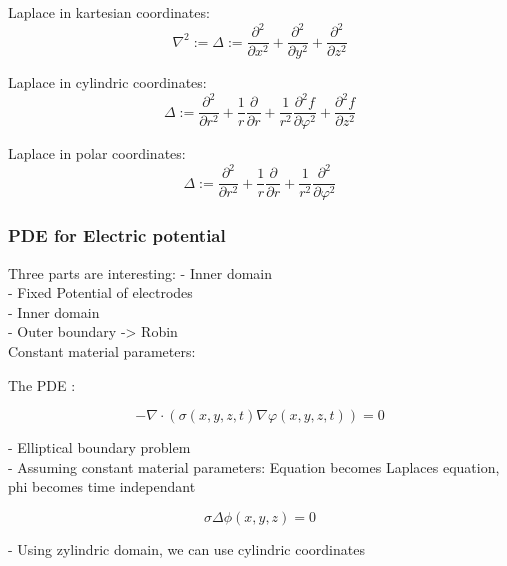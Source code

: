 \documentclass[parskip=half, titlepage=yes, 12pt, BCOR=12mm, DIV=calc]{scrartcl}
\begin{document}
Laplace in kartesian coordinates:
\begin{equation}
    \nabla^2 := \Delta := \frac{\partial^2}{\partial x^2} + \frac{\partial^2}{\partial y^2} + \frac{\partial^2}{\partial z^2}
\end{equation}

Laplace in cylindric coordinates:
\begin{equation}
    \Delta := \frac{\partial^2}{\partial r^2} + \frac{1}{r} \frac{\partial}{\partial r} + \frac{1}{r^2} \frac{\partial^2 f}{\partial \varphi^2} + \frac{\partial^2 f}{\partial z^2}
\end{equation}

Laplace in polar coordinates:
\begin{equation}
    \Delta := \frac{\partial^2}{\partial r^2} + \frac{1}{r} \frac{\partial}{\partial r} + \frac{1}{r^2} \frac{\partial^2}{\partial \varphi^2}
\end{equation}



\subsubsection{PDE for Electric potential}

Three parts are interesting:
- Inner domain \\
- Fixed Potential of electrodes \\
- Inner domain \\
- Outer boundary -> Robin \\

Constant material parameters: \\


The PDE : 

\begin{equation}
    - \nabla \cdot (\sigma(x,y,z,t) \nabla \varphi(x,y,z,t)) = 0
\end{equation}

- Elliptical boundary problem \\
- Assuming constant material parameters: Equation becomes Laplaces equation, phi becomes time independant

\begin{equation}
    \sigma \Delta \phi(x,y,z) = 0
\end{equation}

- Using zylindric domain, we can use cylindric coordinates
\end{document}
